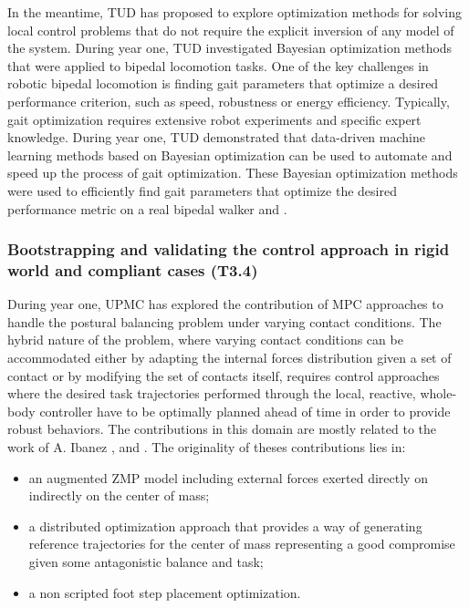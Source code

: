 \documentclass[12pt,a4paper,twoside]{article}
\begin{document}
In the meantime, TUD has proposed to explore optimization methods for solving local control problems that do not require the explicit inversion of any model of the system.  During year one, TUD investigated Bayesian optimization methods that were applied to bipedal locomotion tasks.  One of the key challenges in robotic bipedal locomotion is finding gait parameters that optimize a desired performance criterion, such as speed, robustness or energy efficiency. Typically, gait optimization requires extensive robot experiments and specific expert knowledge. During year one, TUD demonstrated that  data-driven machine learning methods based on Bayesian optimization can be used to automate and speed up the process of gait optimization. These Bayesian optimization methods were used to efficiently find gait parameters that optimize the desired performance metric on a real bipedal walker \cite{calandra2014} and \cite{calandra2014b}.
    

\subsubsection{Bootstrapping and validating the control approach in rigid world and compliant cases (T3.4)}

During year one, UPMC has explored the contribution of MPC approaches to handle the postural balancing problem under varying contact conditions. The hybrid nature of the problem, where varying contact conditions can be accommodated either by adapting the internal forces distribution given a set of contact or by modifying the set of contacts itself, requires control approaches where the desired task trajectories performed through the local, reactive, whole-body controller have to be optimally planned ahead of time in order to provide robust behaviors. The contributions in this domain are mostly related to the work of A. Ibanez \cite{ibanez2013}, \cite{ibanez2014-icra} and \cite{ibanez2014-ark}. The originality of theses contributions lies in:
\begin{itemize}
	\item an augmented ZMP model including external forces exerted directly on indirectly on the center of mass;
	\item a distributed optimization approach that provides a way of generating reference trajectories for the center of mass representing a good compromise given some antagonistic balance and task;
	\item a non scripted foot step placement optimization.
\end{itemize}
\end{document}
